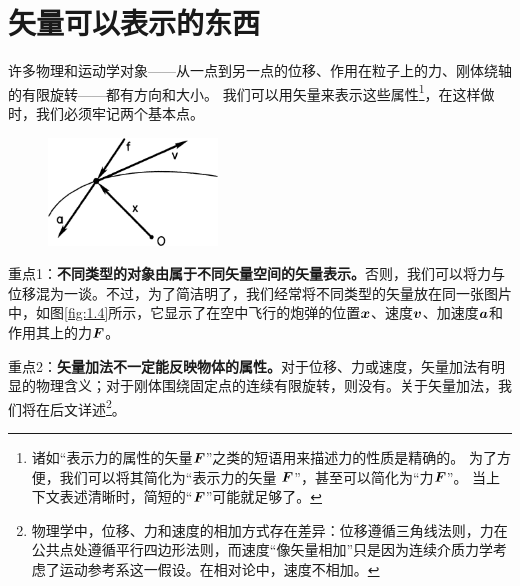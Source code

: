 \section{矢量可以表示的东西}

许多物理和运动学对象——从一点到另一点的位移、作用在粒子上的力、刚体绕轴的有限旋转——都有方向和大小。 我们可以用矢量来表示这些属性\footnote{诸如“表示力的属性的矢量$\boldsymbol{F}$”之类的短语用来描述力的性质是精确的。 为了方便，我们可以将其简化为“表示力的矢量 $\boldsymbol{F}$”，甚至可以简化为“力$\boldsymbol{F}$”。 当上下文表述清晰时，简短的“$\boldsymbol{F}$”可能就足够了。}，在这样做时，我们必须牢记两个基本点。

\begin{figure}[htbp]
	\centering
	\includegraphics[width=0.4\textwidth]{./image/1.4.png}
	\caption{}
	\label{fig:1.4}
\end{figure}

重点1：\textbf{不同类型的对象由属于不同矢量空间的矢量表示。}否则，我们可以将力与位移混为一谈。不过，为了简洁明了，我们经常将不同类型的矢量放在同一张图片中，如图\eqref{fig:1.4}所示，它显示了在空中飞行的炮弹的位置$\boldsymbol{x}$、速度$\boldsymbol{v}$、加速度$\boldsymbol{a}$和作用其上的力$\boldsymbol{F}$。


重点2：\textbf{矢量加法不一定能反映物体的属性。}对于位移、力或速度，矢量加法有明显的物理含义；对于刚体围绕固定点的连续有限旋转，则没有。关于矢量加法，我们将在后文详述\footnote{物理学中，位移、力和速度的相加方式存在差异：位移遵循三角线法则，力在公共点处遵循平行四边形法则，而速度“像矢量相加”只是因为连续介质力学考虑了运动参考系这一假设。在相对论中，速度不相加。}。